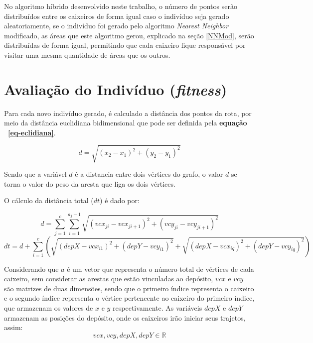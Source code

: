 \documentclass[12pt,openright,a4paper,oneside]{tcc}
\begin{document}
            No algoritmo híbrido desenvolvido neste trabalho, o número de pontos serão distribuídos entre os caixeiros de forma igual caso o indivíduo seja gerado aleatoriamente, se o indivíduo foi gerado pelo algoritmo \textit{Nearest Neighbor} modificado, as áreas que este algoritmo gerou, explicado na seção \ref{NNMod}, serão distribuídas de forma igual, permitindo que cada caixeiro fique responsável por visitar uma mesma quantidade de áreas que os outros.
		       
	   	
	   	\section{Avaliação do Indivíduo (\textit{fitness})}

		Para cada novo indivíduo gerado, é calculado a distância dos pontos da rota, por meio da distância euclidiana bidimensional que pode ser definida pela \textbf{equação ~\ref{eq-eclidiana}}.

		\begin{equation}
			d = \sqrt{(x_2-x_1)^2 + (y_2-y_1)^2}
			\label{eq-eclidiana}
		\end{equation}

		Sendo que a variável $d$ é a distancia entre dois vértices do grafo, o valor $d$ se torna o valor do peso da aresta que liga os dois vértices.

		O cálculo da distância total ($dt$) é dado por:

		\begin{equation}
			d = \sum_{j=1}^{c} \sum_{i=1}^{a_j-1} \sqrt{(vcx_{ji}-vcx_{ji+1})^2 + (vcy_{ji}-vcy_{ji+1})^2}
			\label{eq-ecli1}
		\end{equation}
		\begin{equation}
			dt = d + \sum_{i=1}^{c} (\sqrt{(depX-vcx_{i1})^2 + (depY-vcy_{i1})^2} + \sqrt{(depX-vcx_{iq})^2 + (depY-vcy_{iq})^2})
			\label{eq-ecli2}
		\end{equation}

		Considerando que $a$ é um vetor que representa o número total de vértices de cada caixeiro, sem considerar as  arestas que estão vinculadas ao depósito, $vcx$ e $vcy$ são matrizes de duas dimensões, sendo que o primeiro índice representa o caixeiro e o segundo índice representa o vértice pertencente ao caixeiro do primeiro índice, que armazenam os valores de $x$ e $y$ respectivamente. As variáveis $depX$ e $depY$ armazenam as posições do depósito, onde os caixeiros irão iniciar seus trajetos, assim:
		\begin{equation}
			vcx, vcy, depX, depY \in \mathbb{R}   
			\label{eq-ecli4}
		\end{equation}
\end{document}

